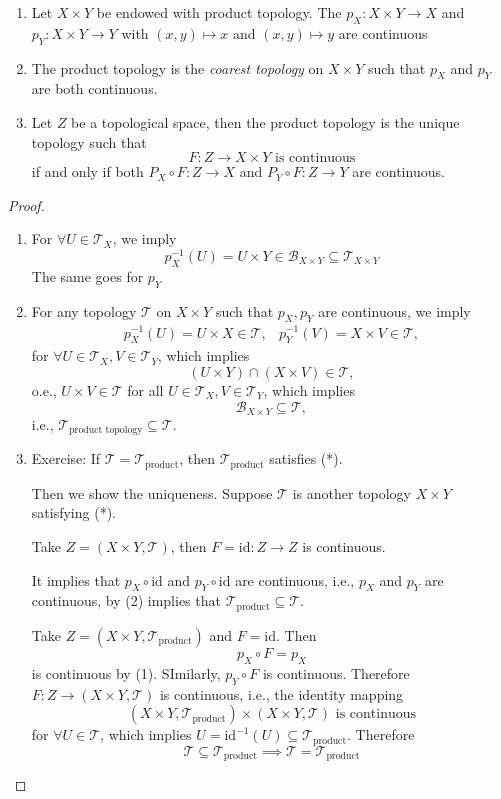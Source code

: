 \begin{proposition}
\begin{enumerate}
\item
Let $X\times Y$ be endowed with product topology. The $p_X:X\times Y\to X$ and $p_Y:X\times Y\to Y$ with $(x,y)\mapsto x$ and $(x,y)\mapsto y$ are continuous
\item
The product topology is the \emph{coarest topology} on $X\times Y$ such that $p_X$ and $p_Y$ are both continuous.
\item
Let $Z$ be a topological space, then the product topology is the unique topology such that 
\[
F:Z\to X\times Y\text{ is continuous}
\]
if and only if both $P_X\circ F:Z\to X$ and $P_Y\circ F:Z\to Y$ are continuous.
\end{enumerate}
\end{proposition}
\begin{proof}
\begin{enumerate}
\item
For $\forall U\in\mathcal{T}_X$, we imply\[
p_X^{-1}(U)=U\times Y\in\mathcal{B}_{X\times Y}\subseteq\mathcal{T}_{X\times Y}
\]
The same goes for $p_Y$
\item
For any topology $\mathcal{T}$ on $X\times Y$ such that  $p_X,p_Y$ are continuous, we imply
\[
\begin{array}{ll}
p_X^{-1}(U)=U\times X\in\mathcal{T},
&
p_Y^{-1}(V)=X\times V\in\mathcal{T},
\end{array}
\]
for $\forall U\in\mathcal{T}_X,V\in\mathcal{T}_Y$, which implies
\[
(U\times Y)\cap(X\times V)\in\mathcal{T},
\]
o.e., $U\times V\in\mathcal{T}$ for all $U\in\mathcal{T}_X,V\in\mathcal{T}_Y$, which implies
\[
\mathcal{B}_{X\times Y}\subseteq\mathcal{T},
\]
i.e., $\mathcal{T}_{\text{product topology}}\subseteq\mathcal{T}$.
\item
Exercise: If $\mathcal{T}=\mathcal{T}_{\text{product}}$, then $\mathcal{T}_{\text{product}}$ satisfies (*).

Then we show the uniqueness. Suppose $\mathcal{T}$ is another topology $X\times Y$ satisfying (*).

Take $Z=(X\times Y,\mathcal{T})$, then $F=\text{id}:Z\to Z$ is continuous.

It implies that $p_X\circ\text{id}$ and $p_Y\circ\text{id}$ are continuous, i.e., $p_X$ and $p_Y$ are continuous, by (2) implies that $\mathcal{T}_{\text{product}}\subseteq\mathcal{T}$.


Take $Z=(X\times Y,\mathcal{T}_{\text{product}})$ and $F=\text{id}$. Then
\[
p_X\circ F=p_X
\]
is continuous by (1). SImilarly, $p_Y\circ F$ is continuous. Therefore $F:Z\to(X\times Y,\mathcal{T})$ is continuous, i.e., the identity mapping
\[
(X\times Y,\mathcal{T}_{\text{product}})
\times
(X\times Y,\mathcal{T})\text{ is continuous}
\]
for $\forall U\in\mathcal{T}$, which implies
$U=\text{id}^{-1}(U)\subseteq\mathcal{T}_{\text{product}}$. Therefore
\[
\mathcal{T}\subseteq\mathcal{T}_{\text{product}}
\implies
\mathcal{T}=\mathcal{T}_{\text{product}}
\]
\end{enumerate}
\end{proof}

